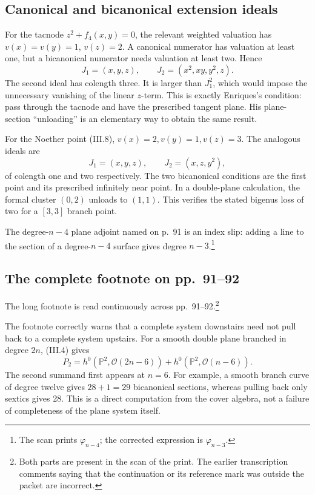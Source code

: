 \subsection{Canonical and bicanonical extension ideals}

For the tacnode \(z^2+f_4(x,y)=0\), the relevant weighted valuation has \(v(x)=v(y)=1\), \(v(z)=2\). A canonical numerator has valuation at least one, but a bicanonical numerator needs valuation at least two. Hence \[
J_1=(x,y,z),\qquad J_2=(x^2,xy,y^2,z).
\] The second ideal has colength three. It is larger than \(J_1^2\), which would impose the unnecessary vanishing of the linear \(z\)-term. This is exactly Enriques's condition: pass through the tacnode and have the prescribed tangent plane. His plane-section ``unloading'' is an elementary way to obtain the same result.

For the Noether point (III.8), \(v(x)=2,v(y)=1,v(z)=3\). The analogous ideals are \[
J_1=(x,y,z),\qquad J_2=(x,z,y^2),
\] of colength one and two respectively. The two bicanonical conditions are the first point and its prescribed infinitely near point. In a double-plane calculation, the formal cluster \((0,2)\) unloads to \((1,1)\). This verifies the stated bigenus loss of two for a \([3,3]\) branch point.

The degree-\(n-4\) plane adjoint named on p.~91 is an index slip: adding a line to the section of a degree-\(n-4\) surface gives degree \(n-3\).\footnote{The scan prints \(\varphi_{n-4}\); the corrected expression is \(\varphi_{n-3}\).}

\subsection{The complete footnote on pp.~91--92}

The long footnote is read continuously across pp.~91--92.\footnote{Both parts are present in the scan of the print. The earlier transcription comments saying that the continuation or its reference mark was outside the packet are incorrect.}

The footnote correctly warns that a complete system downstairs need not pull back to a complete system upstairs. For a smooth double plane branched in degree \(2n\), (III.4) gives \[
P_2=h^0(\mathbb{P}^2,\mathcal O(2n-6))
+h^0(\mathbb{P}^2,\mathcal O(n-6)).
\tag{III.13}
\] The second summand first appears at \(n=6\). For example, a smooth branch curve of degree twelve gives \(28+1=29\) bicanonical sections, whereas pulling back only sextics gives 28. This is a direct computation from the cover algebra, not a failure of completeness of the plane system itself.

